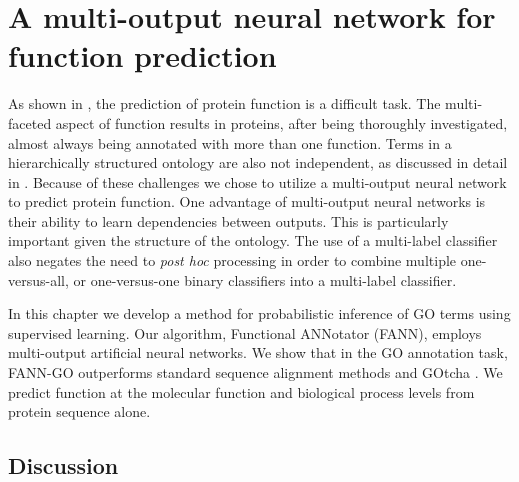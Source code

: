 \chapter{A multi-output neural network for function prediction}


%

As shown in ,  the prediction of protein function is a difficult task.  The multi-faceted aspect of function results in proteins, after being thoroughly investigated, almost always being annotated with more than one function.  Terms in a hierarchically structured ontology are also not independent, as discussed in detail in . Because of these challenges we chose to utilize a multi-output neural network to predict protein function.  One advantage of multi-output neural networks is their ability to learn dependencies between outputs.  This is particularly important given the structure of the ontology.  The use of a multi-label classifier also negates the need to \emph{post hoc} processing in order to combine multiple one-versus-all, or one-versus-one binary classifiers into a multi-label classifier.

In this chapter we  develop a method for probabilistic inference of GO terms using supervised learning. Our algorithm, Functional ANNotator (FANN), employs multi-output artificial neural networks. We show that in the GO annotation task, FANN-GO outperforms standard sequence alignment methods and GOtcha \citep{Martin2004}. We predict function at the molecular function and biological process levels from protein sequence alone. 






\section{Discussion}

